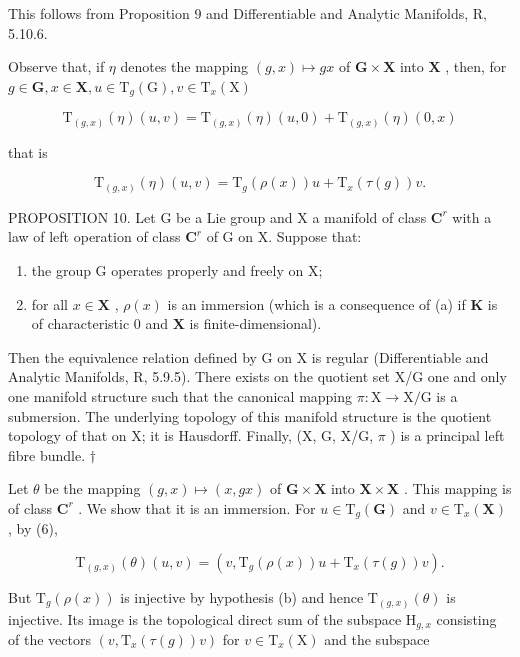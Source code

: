 This follows from Proposition 9 and Differentiable and Analytic Manifolds, R, 5.10.6.

Observe that, if \(\eta\) denotes the mapping \((g,x)\mapsto gx\) of \(\mathbf{G}\times \mathbf{X}\) into \(\mathbf{X}\) , then, for \(g\in \mathbf{G},x\in \mathbf{X},u\in \mathrm{T}_g(\mathrm{G}),v\in \mathrm{T}_x(\mathrm{X})\)

\[
\mathrm{T} _ {(g, x)} (\eta) (u, v) = \mathrm{T} _ {(g, x)} (\eta) (u, 0) + \mathrm{T} _ {(g, x)} (\eta) (0, x)
\]

that is

\[
\mathrm{T} _ {(g, x)} (\eta) (u, v) = \mathrm{T} _ {g} (\rho (x)) u + \mathrm{T} _ {x} (\tau (g)) v.\tag{6}
\]

PROPOSITION 10. Let G be a Lie group and X a manifold of class \(\mathbf{C}^r\) with a law of left operation of class \(\mathbf{C}^r\) of G on X. Suppose that:

\begin{enumerate}
\def\labelenumi{(\alph{enumi})}
\item
  the group G operates properly and freely on X;
\item
  for all \(x \in \mathbf{X}\) , \(\rho(x)\) is an immersion (which is a consequence of (a) if \(\mathbf{K}\) is of characteristic 0 and \(\mathbf{X}\) is finite-dimensional).
\end{enumerate}

Then the equivalence relation defined by G on X is regular (Differentiable and Analytic Manifolds, R, 5.9.5). There exists on the quotient set X/G one and only one manifold structure such that the canonical mapping \(\pi: \mathrm{X} \to \mathrm{X} / \mathrm{G}\) is a submersion. The underlying topology of this manifold structure is the quotient topology of that on X; it is Hausdorff. Finally, (X, G, X/G, \(\pi\) ) is a principal left fibre bundle. \(\dagger\)

Let \(\theta\) be the mapping \((g, x) \mapsto (x, gx)\) of \(\mathbf{G} \times \mathbf{X}\) into \(\mathbf{X} \times \mathbf{X}\) . This mapping is of class \(\mathbf{C}^r\) . We show that it is an immersion. For \(u \in \mathrm{T}_g(\mathbf{G})\) and \(v \in \mathrm{T}_x(\mathbf{X})\) , by (6),

\[
\mathrm{T} _ {(g, x)} (\theta) (u, v) = (v, \mathrm{T} _ {g} (\rho (x)) u + \mathrm{T} _ {x} (\tau (g)) v).\tag{7}
\]

But \(\mathrm{T}_{g}(\rho(x))\) is injective by hypothesis (b) and hence \(\mathrm{T}_{(g,x)}(\theta)\) is injective. Its image is the topological direct sum of the subspace \(\mathrm{H}_{g,x}\) consisting of the vectors \((v,\mathrm{T}_x(\tau(g))v)\) for \(v\in \mathrm{T}_x(\mathrm{X})\) and the subspace

